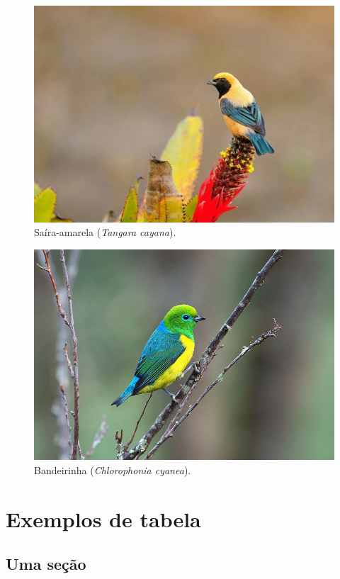 \documentclass[
	10pt,				%
	openright,			%
	twoside,			%
	a5paper,			%
	english,			%
	french,				%
	spanish,			%
	brazil,				%
	sumario=tradicional
]{abntex2}
\begin{document}
\lipsum[6]

\begin{figure}
\centering
\includegraphics[width=0.6\linewidth]{abntex2-modelo-livro-saira-amarela}
\caption{Saíra-amarela (\textit{Tangara cayana}).}
\label{fig:saira-amarela}
\end{figure}

\begin{figure}
\centering
\includegraphics[width=0.6\linewidth]{abntex2-modelo-livro-bandeirinha}
\caption{Bandeirinha (\textit{Chlorophonia cyanea}).}
\label{fig:bandeirinha}
\end{figure}


\lipsum[7]

\chapter{Exemplos de tabela}

\section{Uma seção}

\lipsum[8]
\end{document}
